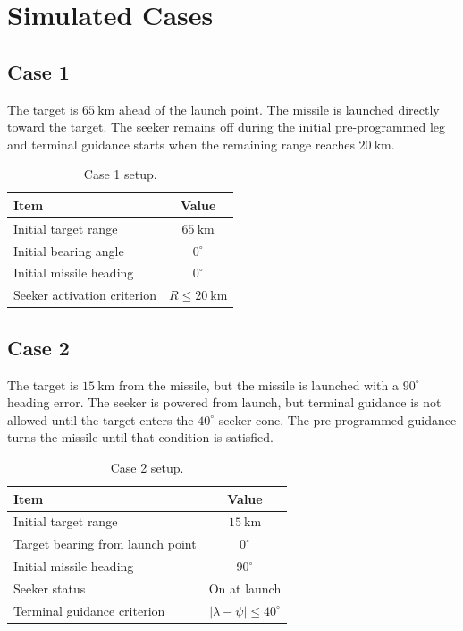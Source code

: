 \section{Simulated Cases}

\subsection{Case 1}

The target is \(65~\text{km}\) ahead of the launch point. The missile is launched directly toward the target. The seeker remains off during the initial pre-programmed leg and terminal guidance starts when the remaining range reaches \(20~\text{km}\).

\begin{table}[H]
\centering
\caption{Case 1 setup.}
\begin{tabular}{lc}
\toprule
Item & Value \\
\midrule
Initial target range & \(65~\text{km}\) \\
Initial bearing angle & \(0^\circ\) \\
Initial missile heading & \(0^\circ\) \\
Seeker activation criterion & \(R \leq 20~\text{km}\) \\
\bottomrule
\end{tabular}
\end{table}

\subsection{Case 2}

The target is \(15~\text{km}\) from the missile, but the missile is launched with a \(90^\circ\) heading error. The seeker is powered from launch, but terminal guidance is not allowed until the target enters the \(40^\circ\) seeker cone. The pre-programmed guidance turns the missile until that condition is satisfied.

\begin{table}[H]
\centering
\caption{Case 2 setup.}
\begin{tabular}{lc}
\toprule
Item & Value \\
\midrule
Initial target range & \(15~\text{km}\) \\
Target bearing from launch point & \(0^\circ\) \\
Initial missile heading & \(90^\circ\) \\
Seeker status & On at launch \\
Terminal guidance criterion & \(|\lambda-\psi| \leq 40^\circ\) \\
\bottomrule
\end{tabular}
\end{table}
